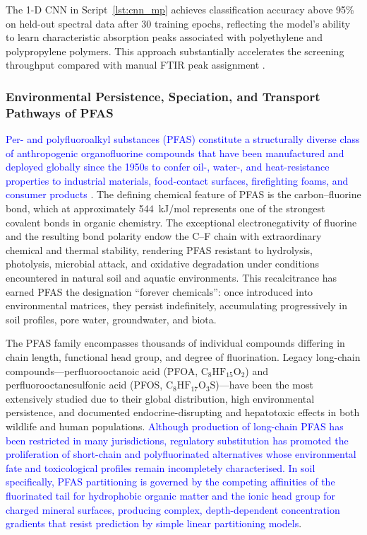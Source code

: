 \documentclass[environments,article,submit,pdftex,moreauthors]{Definitions/mdpi}
\begin{document}
The 1-D CNN in Script~\ref{lst:cnn_mp} achieves classification accuracy
above 95\% on held-out spectral data after 30 training epochs, reflecting
the model's ability to learn characteristic absorption peaks associated
with polyethylene and polypropylene polymers. This approach substantially
accelerates the screening throughput compared with manual FTIR peak
assignment \cite{Chen2020,LindhLemenkova2023e}.

\subsubsection{Environmental Persistence, Speciation, and Transport Pathways
    of PFAS}\label{sec2.1.4}

\textcolor{blue}{Per- and polyfluoroalkyl substances (PFAS) constitute
a structurally diverse class of anthropogenic organofluorine compounds
that have been manufactured and deployed globally since the 1950s to
confer oil-, water-, and heat-resistance properties to industrial
materials, food-contact surfaces, firefighting foams, and consumer
products} \cite{Brusseau}. The defining chemical feature of PFAS is the
carbon--fluorine bond, which at approximately 544~kJ/mol represents
one of the strongest covalent bonds in organic chemistry. The
exceptional electronegativity of fluorine and the resulting bond
polarity endow the C--F chain with extraordinary chemical and thermal
stability, rendering PFAS resistant to hydrolysis, photolysis,
microbial attack, and oxidative degradation under conditions
encountered in natural soil and aquatic environments. This
recalcitrance has earned PFAS the designation ``forever chemicals'':
once introduced into environmental matrices, they persist
indefinitely, accumulating progressively in soil profiles, pore water,
groundwater, and biota.

The PFAS family encompasses thousands of individual compounds
differing in chain length, functional head group, and degree of
fluorination. Legacy long-chain compounds---perfluorooctanoic acid
(PFOA, $\mathrm{C_8HF_{15}O_2}$) and perfluorooctanesulfonic acid
(PFOS, $\mathrm{C_8HF_{17}O_3S}$)---have been the most extensively
studied due to their global distribution, high environmental
persistence, and documented endocrine-disrupting and hepatotoxic
effects in both wildlife and human populations. \textcolor{blue}{Although production of
long-chain PFAS has been restricted in many jurisdictions, regulatory
substitution has promoted the proliferation of short-chain and
polyfluorinated alternatives whose environmental fate and toxicological
profiles remain incompletely characterised. In soil specifically, PFAS
partitioning is governed by the competing affinities of the
fluorinated tail for hydrophobic organic matter and the ionic head
group for charged mineral surfaces, producing complex,
depth-dependent concentration gradients that resist prediction by
simple linear partitioning models}.
\end{document}

